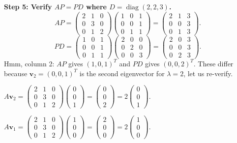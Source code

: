\documentclass[12pt,a4paper]{article}
\begin{document}
\textbf{Step 5: Verify $AP = PD$ where $D = \operatorname{diag}(2,2,3)$.}
\[
  AP = \begin{pmatrix}2&1&0\\0&3&0\\0&1&2\end{pmatrix}\begin{pmatrix}1&0&1\\0&0&1\\0&1&1\end{pmatrix}
     = \begin{pmatrix}2&1&3\\0&0&3\\0&1&3\end{pmatrix}.
\]
\[
  PD = \begin{pmatrix}1&0&1\\0&0&1\\0&1&1\end{pmatrix}\begin{pmatrix}2&0&0\\0&2&0\\0&0&3\end{pmatrix}
     = \begin{pmatrix}2&0&3\\0&0&3\\0&2&3\end{pmatrix}.
\]
Hmm, column 2: $AP$ gives $(1, 0, 1)^T$ and $PD$ gives $(0,0,2)^T$. These differ because $\mathbf{v}_2 = (0,0,1)^T$ is the second eigenvector for $\lambda=2$, let us re-verify.

$A\mathbf{v}_2 = \begin{pmatrix}2&1&0\\0&3&0\\0&1&2\end{pmatrix}\begin{pmatrix}0\\0\\1\end{pmatrix} = \begin{pmatrix}0\\0\\2\end{pmatrix} = 2\begin{pmatrix}0\\0\\1\end{pmatrix}$. \checkmark

$A\mathbf{v}_1 = \begin{pmatrix}2&1&0\\0&3&0\\0&1&2\end{pmatrix}\begin{pmatrix}1\\0\\0\end{pmatrix} = \begin{pmatrix}2\\0\\0\end{pmatrix} = 2\begin{pmatrix}1\\0\\0\end{pmatrix}$. \checkmark
\end{document}
